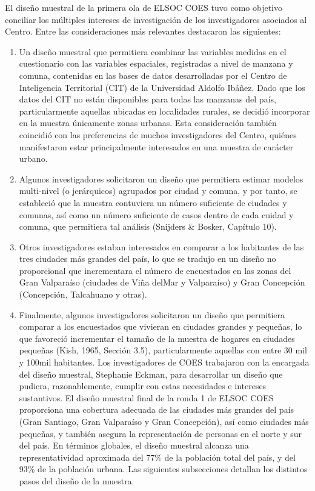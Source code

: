 \documentclass[
]{book}
\begin{document}
El diseño muestral de la primera ola de ELSOC COES tuvo como objetivo conciliar los múltiples intereses de investigación de los investigadores asociados al Centro. Entre las consideraciones más relevantes destacaron las siguientes:

\begin{enumerate}
\def\labelenumi{\arabic{enumi}.}
\item
  Un diseño muestral que permitiera combinar las variables medidas en el cuestionario con las variables espaciales, registradas a nivel de manzana y comuna, contenidas en las bases de datos desarrolladas por el Centro de Inteligencia Territorial (CIT) de la Universidad Aldolfo Ibáñez. Dado que los datos del CIT no están disponibles para todas las manzanas del país, particularmente aquellas ubicadas en localidades rurales, se decidió incorporar en la muestra únicamente zonas urbanas. Esta consideración también coincidió con las preferencias de muchos investigadores del Centro, quiénes manifestaron estar principalmente interesados en una muestra de carácter urbano.
\item
  Algunos investigadores solicitaron un diseño que permitiera estimar modelos multi-nivel (o jerárquicos) agrupados por ciudad y comuna, y por tanto, se estableció que la muestra contuviera un número suficiente de ciudades y comunas, así como un número suficiente de casos dentro de cada cuidad y comuna, que permitiera tal análisis (Snijders \& Bosker, Capítulo 10).
\item
  Otros investigadores estaban interesados en comparar a los habitantes de las tres ciudades más grandes del país, lo que se tradujo en un diseño no proporcional que incrementara el número de encuestados en las zonas del Gran Valparaíso (ciudades de Viña delMar y Valparaíso) y Gran Concepción (Concepción, Talcahuano y otras).
\item
  Finalmente, algunos investigadores solicitaron un diseño que permitiera comparar a los encuestados que vivieran en ciudades grandes y pequeñas, lo que favoreció incrementar el tamaño de la muestra de hogares en ciudades pequeñas (Kish, 1965, Sección 3.5), particularmente aquellas con entre 30 mil y 100mil habitantes. Los investigadores de COES trabajaron con la encargada del diseño muestral, Stephanie Eckman, para desarrollar un diseño que pudiera, razonablemente, cumplir con estas necesidades e intereses sustantivos. El diseño muestral final de la ronda 1 de ELSOC COES proporciona una cobertura adecuada de las ciudades más grandes del país (Gran Santiago, Gran Valparaíso y Gran Concepción), así como ciudades más pequeñas, y también asegura la representación de personas en el norte y sur del país. En términos globales, el diseño muestral alcanza una representatividad aproximada del 77\% de la población total del país, y del 93\% de la población urbana. Las siguientes subsecciones detallan los distintos pasos del diseño de la muestra.
\end{enumerate}
\end{document}
